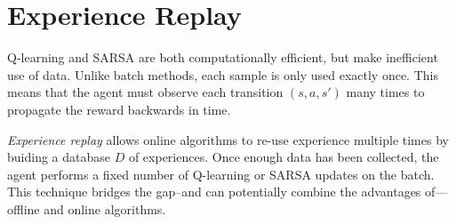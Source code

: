 \documentclass[11pt]{article}
\numberwithin{equation}{section}
\numberwithin{figure}{section}
\begin{document}
\section{Experience Replay}
Q-learning and SARSA are both computationally efficient, but make inefficient
use of data. Unlike batch methods, each sample is only used exactly once. This
means that the agent must observe each transition $(s, a, s')$ many times to
propagate the reward backwards in time.

\emph{Experience replay} allows online algorithms to re-use experience multiple
times by buiding a database $D$ of experiences.  Once enough data has been
collected, the agent performs a fixed number of Q-learning or SARSA updates on
the batch. This technique bridges the gap--and can potentially combine the
advantages of---offline and online algorithms.
\end{document}
